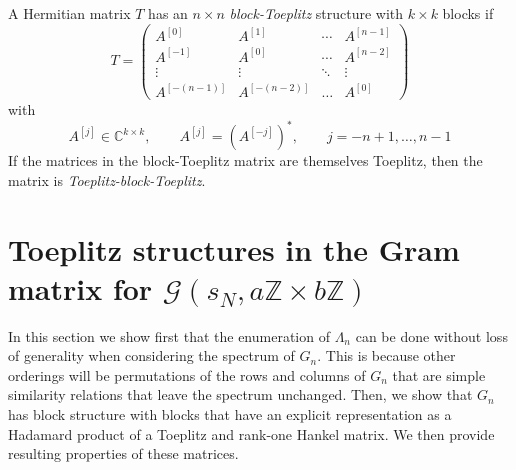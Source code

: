 \documentclass{article}
\newcommand{\C}{\mathbb{C}}
\begin{document}
A Hermitian matrix \(T\) has an \(n \times n\) \textit{block-Toeplitz}
structure with \(k \times k\) blocks if
\begin{equation*}
	T = \begin{pmatrix}
		A^{[0]} & A^{[1]} & \cdots & A^{[n-1]} \\[1ex]
		A^{[-1]} & A^{[0]} & \cdots & A^{[n-2]} \\[1ex]
		\vdots & \vdots & \ddots & \vdots \\[1ex]
		A^{[-(n-1)]} & A^{[-(n-2)]} & \hdots & A^{[0]}
	\end{pmatrix}
\end{equation*}
with
\begin{equation*}
	A^{[j]} \in \C^{k \times k}, \qquad A^{[j]} = (A^{[-j]})^*, \qquad
		j = -n+1, \hdots, n-1
\end{equation*}
If the matrices in the block-Toeplitz matrix are themselves Toeplitz,
then the matrix is \textit{Toeplitz-block-Toeplitz}.



\section{Toeplitz structures in the Gram matrix for $\mathcal{G}(s_N, a\mathbb{Z}\times b\mathbb{Z} )$}\label{sec:gram_block}



In this section we show first that the enumeration of $\Lambda_n$ can be done without loss of generality when considering the spectrum of ${G}_n$. This is because other orderings will be permutations of the rows and columns of ${G}_n$ that are simple similarity relations that leave the spectrum unchanged. Then, we show that $G_n$ has block structure with blocks that have an explicit representation as a Hadamard product of a Toeplitz and rank-one Hankel matrix. We then provide resulting properties of these matrices.




\end{document}
